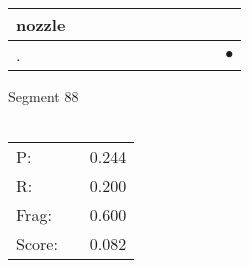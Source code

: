 \documentclass[landscape]{article}
\newcommand{\ssp}{\hspace{2pt}}
\newcommand{\mex}{\cellcolor{g}$\bullet$}
\begin{document}
\begin{tabular}{|l|p{10pt}|p{10pt}|p{10pt}|p{10pt}|p{10pt}|p{10pt}|p{10pt}|p{10pt}|p{10pt}|p{10pt}|}
\hline
\ssp nozzle \ssp&\hspace{2pt}&\hspace{2pt}&\hspace{2pt}&\hspace{2pt}&\hspace{2pt}&\hspace{2pt}&\hspace{2pt}&\hspace{2pt}&\hspace{2pt}&\hspace{2pt}\\
\hline
\ssp \cellcolor{ref9}. \ssp&\hspace{2pt}&\hspace{2pt}&\hspace{2pt}&\hspace{2pt}&\hspace{2pt}&\hspace{2pt}&\hspace{2pt}&\hspace{2pt}&\hspace{2pt}&\hspace{2pt}\mex\\
\hline
\end{tabular}

\vspace{6pt}
\noindent Segment 88\\\\
\noindent\begin{tabular}{lm{12pt}r}
\hline
P:&&0.244\\
R:&&0.200\\
Frag:&&0.600\\
Score:&&0.082\\
\end{tabular}

\newpage
\end{document}
